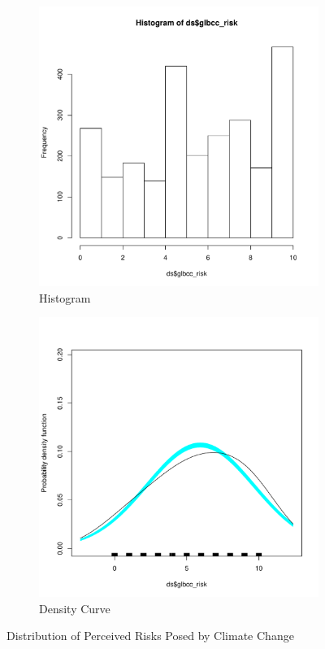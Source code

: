 \documentclass[11pt,openany]{book}\usepackage[]{graphicx}\usepackage[]{color}
\begin{document}
\begin{figure}
        \centering
        \begin{subfigure}[b]{0.4\textwidth}
                \centering
                \includegraphics[width=\textwidth]{03_Data/rskhist.pdf}%
                \caption{Histogram}
        \end{subfigure}
        \begin{subfigure}[b]{0.4\textwidth}
                \centering
                \includegraphics[width=\textwidth]{03_Data/rskden.pdf}%
                \caption{Density Curve}
        \end{subfigure}
                \caption{Distribution of Perceived Risks Posed by Climate Change 
                \label{fig:rsk_2}} 
                                        
\end{figure}
\end{document}
